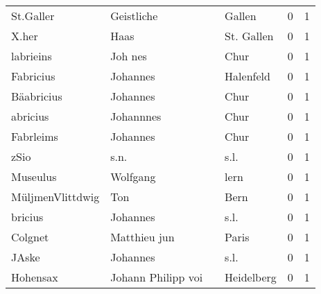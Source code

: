 \begin{tabular}{llllrr}
                St.Galler &                         Geistliche &             &                                      Gallen &          0 &         1 \\
                    X.her &                               Haas &             &                                  St. Gallen &          0 &         1 \\
                labrieins &                            Joh nes &             &                                        Chur &          0 &         1 \\
                Fabricius &                           Johannes &             &                                   Halenfeld &          0 &         1 \\
               Bäabricius &                           Johannes &             &                                        Chur &          0 &         1 \\
                 abricius &                          Johannnes &             &                                        Chur &          0 &         1 \\
                Fabrleims &                           Johannes &             &                                        Chur &          0 &         1 \\
                     zSio &                               s.n. &             &                                        s.l. &          0 &         1 \\
                 Museulus &                           Wolfgang &             &                                        lern &          0 &         1 \\
         MüljmenVlittdwig &                                Ton &             &                                        Bern &          0 &         1 \\
                  bricius &                           Johannes &             &                                        s.l. &          0 &         1 \\
                  Colgnet &                       Matthieu jun &             &                                       Paris &          0 &         1 \\
                    JAske &                           Johannes &             &                                        s.l. &          0 &         1 \\
                 Hohensax &                 Johann Philipp voi &             &                                  Heidelberg &          0 &         1 \\

\end{tabular}
